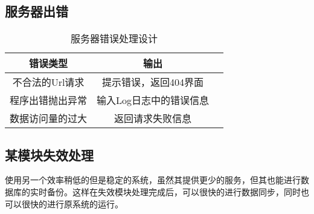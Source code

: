 \subsection{服务器出错}
\begin{table}[htbp]
	\centering
	\caption{服务器错误处理设计} \label{tab:server_error_handling_design}
	\begin{tabular}{|c|c|c|}
		\hline
		错误类型      & 输出 \\
		\hline
		不合法的Url请求 & 提示错误，返回404界面 \\
		\hline
		程序出错抛出异常 & 输入Log日志中的错误信息  \\
		\hline
		数据访问量的过大 & 返回请求失败信息 \\
		\hline
    \end{tabular}
\end{table}

\subsection{某模块失效处理}
使用另一个效率稍低的但是稳定的系统，虽然其提供更少的服务，但其也能进行数据库的实时备份。这样在失效模块处理完成后，可以很快的进行数据同步，同时也可以很快的进行原系统的运行。
